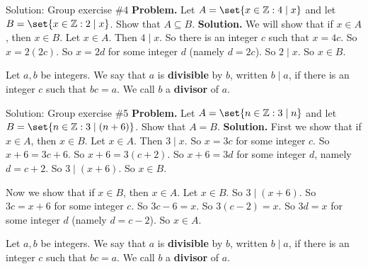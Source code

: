 \documentclass[10pt]{beamer}
\begin{document}
\begin{frame}{Solution: Group exercise \#4}
\textbf{Problem.}   Let $A = \set{x \in \mathbb{Z} : 4 \mid x}$ and let $B = \set{x \in \mathbb{Z} : 2 \mid x}$. Show that $A \subseteq B$. 
\vfill
\textbf{Solution.} We will show that if $x \in A$, then $x \in B$. Let $x \in A$.  Then $4 \mid x$. So there is an integer $c$ such that $x=4c$.  So $x=2(2c)$.  So $x=2d$ for some integer $d$ (namely $d=2c$). So $2 \mid x$.  So $x \in B$.

\vfill
\begin{mygreenbox}[title={Reference: Definition}]
Let $a,b$ be integers.  We say that $a$ is \textbf{divisible} by $b$, written $b \mid a$, if there is an integer $c$ such that $bc=a$. We call $b$ a \textbf{divisor} of $a$.	
\end{mygreenbox}

\end{frame}




\begin{frame}{Solution: Group exercise \#5}
\textbf{Problem.}   Let $A = \set{n \in \mathbb{Z} : 3 \mid n}$ and let $B = \set{n \in \mathbb{Z} : 3 \mid (n+6)}$. Show that $A=B$. 
\vfill
\textbf{Solution.} First we show that if $x \in A$, then $x \in B$. Let $x \in A$.  Then $3 \mid x$.   So $x=3c$ for some integer $c$. So $x+6=3c+6$. So $x+6=3(c+2)$. So $x+6=3d$ for some integer $d$, namely $d=c+2$.   So $3 \mid (x+6)$. So $x \in B$.

Now we show that if $x \in B$, then $x \in A$. Let $x \in B$. So $3 \mid (x+6)$.  So $3c=x+6$ for some integer $c$.   So $3c-6=x$. So $3(c-2)=x$.  So $3d=x$ for some integer $d$ (namely $d=c-2$).   So $x \in A$. 
\vfill
\begin{mygreenbox}[title={Reference: Definition}]
Let $a,b$ be integers.  We say that $a$ is \textbf{divisible} by $b$, written $b \mid a$, if there is an integer $c$ such that $bc=a$. We call $b$ a \textbf{divisor} of $a$.	
\end{mygreenbox}

\end{frame}
\end{document}
